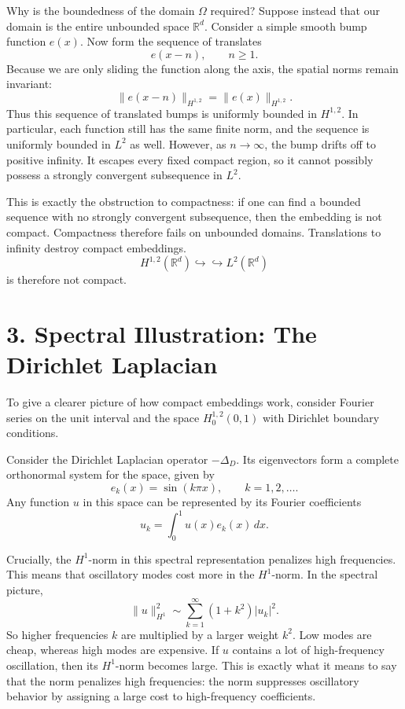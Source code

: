 \documentclass[11pt]{article}
\theoremstyle{definition}
\theoremstyle{remark}
\begin{document}
Why is the boundedness of the domain $\Omega$ required? Suppose instead that our domain is the entire unbounded space $\mathbb{R}^d$. Consider a simple smooth bump function $e(x)$. Now form the sequence of translates
\[
  e(x-n), \qquad n\ge 1.
\]
Because we are only sliding the function along the axis, the spatial norms remain invariant:
\[
  \|e(x-n)\|_{H^{1,2}} = \|e(x)\|_{H^{1,2}}.
\]
Thus this sequence of translated bumps is uniformly bounded in $H^{1,2}$. In particular, each function still has the same finite norm, and the sequence is uniformly bounded in $L^2$ as well. However, as $n\to\infty$, the bump drifts off to positive infinity. It escapes every fixed compact region, so it cannot possibly possess a strongly convergent subsequence in $L^2$.

This is exactly the obstruction to compactness: if one can find a bounded sequence with no strongly convergent subsequence, then the embedding is not compact. Compactness therefore fails on unbounded domains. Translations to infinity destroy compact embeddings.
\[
  H^{1,2}(\mathbb{R}^d) \hookrightarrow \hookrightarrow L^2(\mathbb{R}^d)
\]
is therefore not compact.

\section*{3. Spectral Illustration: The Dirichlet Laplacian}
To give a clearer picture of how compact embeddings work, consider Fourier series on the unit interval and the space $H_0^{1,2}(0,1)$ with Dirichlet boundary conditions.

Consider the Dirichlet Laplacian operator $-\Delta_D$. Its eigenvectors form a complete orthonormal system for the space, given by
\[
  e_k(x)=\sin(k\pi x), \qquad k=1,2,\dots.
\]
Any function $u$ in this space can be represented by its Fourier coefficients
\[
  u_k=\int_0^1 u(x)e_k(x)\,dx.
\]

Crucially, the $H^1$-norm in this spectral representation penalizes high frequencies. This means that oscillatory modes cost more in the $H^1$-norm. In the spectral picture,
\[
  \|u\|_{H^1}^2 \sim \sum_{k=1}^{\infty} (1+k^2)|u_k|^2.
\]
So higher frequencies $k$ are multiplied by a larger weight $k^2$. Low modes are cheap, whereas high modes are expensive. If $u$ contains a lot of high-frequency oscillation, then its $H^1$-norm becomes large. This is exactly what it means to say that the norm penalizes high frequencies: the norm suppresses oscillatory behavior by assigning a large cost to high-frequency coefficients.
\end{document}
